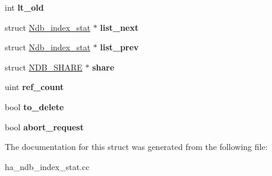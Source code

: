 \begin{DoxyCompactItemize}
\mbox{\label{structNdb__index__stat_a62cfd0d514796d50de7acbf2c0cae60b}} 
int {\bfseries lt\+\_\+old}
\item 
\mbox{\label{structNdb__index__stat_a4337468917dfe05b70c0c3875a3e89e9}} 
struct \mbox{\hyperlink{structNdb__index__stat}{Ndb\+\_\+index\+\_\+stat}} $\ast$ {\bfseries list\+\_\+next}
\item 
\mbox{\label{structNdb__index__stat_a0fa977df3e8891ffd7a1ee37b8dd874f}} 
struct \mbox{\hyperlink{structNdb__index__stat}{Ndb\+\_\+index\+\_\+stat}} $\ast$ {\bfseries list\+\_\+prev}
\item 
\mbox{\label{structNdb__index__stat_a2a2c9c20b5e65ee5409aaa251e2a80f4}} 
struct \mbox{\hyperlink{structNDB__SHARE}{N\+D\+B\+\_\+\+S\+H\+A\+RE}} $\ast$ {\bfseries share}
\item 
\mbox{\label{structNdb__index__stat_af68242d243abf6f9a5bef7383856474c}} 
uint {\bfseries ref\+\_\+count}
\item 
\mbox{\label{structNdb__index__stat_a7569f961167a412f7ced50ba2a4321eb}} 
bool {\bfseries to\+\_\+delete}
\item 
\mbox{\label{structNdb__index__stat_a74968c9b19b091a70f1fd975b5c4b4fa}} 
bool {\bfseries abort\+\_\+request}
\end{DoxyCompactItemize}


The documentation for this struct was generated from the following file\+:\begin{DoxyCompactItemize}
\item 
ha\+\_\+ndb\+\_\+index\+\_\+stat.\+cc\end{DoxyCompactItemize}
